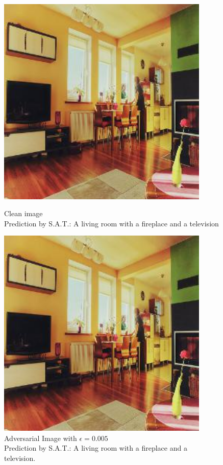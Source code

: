 \begin{figure}[ht]
    \centering
    \begin{minipage}{0.45\textwidth}
        \centering
        \includegraphics[width=0.9\textwidth]{../code/ShowDistractAndDeceive/samples/0.000/img_0.jpg} %
        \caption*{Clean image\\Prediction by S.A.T.: A living room with a fireplace and a television}
    \end{minipage}\hfill
    \begin{minipage}{0.45\textwidth}
        \centering
        \includegraphics[width=0.9\textwidth]{../code/ShowDistractAndDeceive/samples/0.005/img_0.jpg} %
        \caption*{Adversarial Image with $\epsilon=0.005$\\Prediction by S.A.T.: A living room with a fireplace and a television.}
    \end{minipage}
\end{figure}

